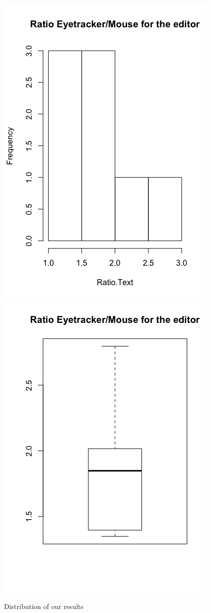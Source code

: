 \documentclass[12pt, a4paper]{article}
\begin{document}
\begin{figure}
\centering
\includegraphics[scale=.35]{histText}
\includegraphics[scale=.35]{boxText}
\caption{Distribution of our results}
\label{dataPlot}
\end{figure}
\end{document}
